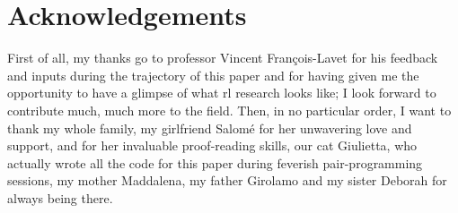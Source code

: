 \section{Acknowledgements}

First of all, my thanks go to professor Vincent François-Lavet for his feedback and inputs during the trajectory of this paper and for having given me the opportunity to have a glimpse of what \acrshort{rl} research looks like; I look forward to contribute much, much more to the field. Then, in no particular order, I want to thank my whole family, my girlfriend Salomé for her unwavering love and support, and for her invaluable proof-reading skills, our cat Giulietta, who actually wrote all the code for this paper during feverish pair-programming sessions, my mother Maddalena, my father Girolamo and my sister Deborah for always being there.
